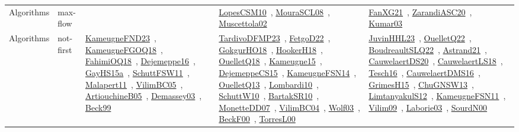 {\begin{longtable}{lp{3cm}>{\raggedright\arraybackslash}p{6cm}>{\raggedright\arraybackslash}p{6cm}>{\raggedright\arraybackslash}p{8cm}}
Algorithms & max-flow &  & \href{works/LopesCSM10.pdf}{LopesCSM10}~\cite{LopesCSM10}, \href{works/MouraSCL08.pdf}{MouraSCL08}~\cite{MouraSCL08}, \href{works/Muscettola02.pdf}{Muscettola02}~\cite{Muscettola02} & \href{works/FanXG21.pdf}{FanXG21}~\cite{FanXG21}, \href{works/ZarandiASC20.pdf}{ZarandiASC20}~\cite{ZarandiASC20}, \href{works/Kumar03.pdf}{Kumar03}~\cite{Kumar03}\\
Algorithms & not-first & \href{works/KameugneFND23.pdf}{KameugneFND23}~\cite{KameugneFND23}, \href{works/KameugneFGOQ18.pdf}{KameugneFGOQ18}~\cite{KameugneFGOQ18}, \href{works/FahimiOQ18.pdf}{FahimiOQ18}~\cite{FahimiOQ18}, \href{works/Dejemeppe16.pdf}{Dejemeppe16}~\cite{Dejemeppe16}, \href{works/GayHS15a.pdf}{GayHS15a}~\cite{GayHS15a}, \href{works/SchuttFSW11.pdf}{SchuttFSW11}~\cite{SchuttFSW11}, \href{works/Malapert11.pdf}{Malapert11}~\cite{Malapert11}, \href{works/VilimBC05.pdf}{VilimBC05}~\cite{VilimBC05}, \href{works/ArtiouchineB05.pdf}{ArtiouchineB05}~\cite{ArtiouchineB05}, \href{works/Demassey03.pdf}{Demassey03}~\cite{Demassey03}, \href{works/Beck99.pdf}{Beck99}~\cite{Beck99} & \href{works/TardivoDFMP23.pdf}{TardivoDFMP23}~\cite{TardivoDFMP23}, \href{works/FetgoD22.pdf}{FetgoD22}~\cite{FetgoD22}, \href{works/GokgurHO18.pdf}{GokgurHO18}~\cite{GokgurHO18}, \href{works/HookerH18.pdf}{HookerH18}~\cite{HookerH18}, \href{works/OuelletQ18.pdf}{OuelletQ18}~\cite{OuelletQ18}, \href{works/Kameugne15.pdf}{Kameugne15}~\cite{Kameugne15}, \href{works/DejemeppeCS15.pdf}{DejemeppeCS15}~\cite{DejemeppeCS15}, \href{works/KameugneFSN14.pdf}{KameugneFSN14}~\cite{KameugneFSN14}, \href{works/OuelletQ13.pdf}{OuelletQ13}~\cite{OuelletQ13}, \href{works/Lombardi10.pdf}{Lombardi10}~\cite{Lombardi10}, \href{works/SchuttW10.pdf}{SchuttW10}~\cite{SchuttW10}, \href{works/BartakSR10.pdf}{BartakSR10}~\cite{BartakSR10}, \href{works/MonetteDD07.pdf}{MonetteDD07}~\cite{MonetteDD07}, \href{works/VilimBC04.pdf}{VilimBC04}~\cite{VilimBC04}, \href{works/Wolf03.pdf}{Wolf03}~\cite{Wolf03}, \href{works/BeckF00.pdf}{BeckF00}~\cite{BeckF00}, \href{works/TorresL00.pdf}{TorresL00}~\cite{TorresL00} & \href{works/JuvinHHL23.pdf}{JuvinHHL23}~\cite{JuvinHHL23}, \href{works/OuelletQ22.pdf}{OuelletQ22}~\cite{OuelletQ22}, \href{works/BoudreaultSLQ22.pdf}{BoudreaultSLQ22}~\cite{BoudreaultSLQ22}, \href{works/Astrand21.pdf}{Astrand21}~\cite{Astrand21}, \href{works/CauwelaertDS20.pdf}{CauwelaertDS20}~\cite{CauwelaertDS20}, \href{works/CauwelaertLS18.pdf}{CauwelaertLS18}~\cite{CauwelaertLS18}, \href{works/Tesch16.pdf}{Tesch16}~\cite{Tesch16}, \href{works/CauwelaertDMS16.pdf}{CauwelaertDMS16}~\cite{CauwelaertDMS16}, \href{works/GrimesH15.pdf}{GrimesH15}~\cite{GrimesH15}, \href{works/ChuGNSW13.pdf}{ChuGNSW13}~\cite{ChuGNSW13}, \href{works/LimtanyakulS12.pdf}{LimtanyakulS12}~\cite{LimtanyakulS12}, \href{works/KameugneFSN11.pdf}{KameugneFSN11}~\cite{KameugneFSN11}, \href{works/Vilim09.pdf}{Vilim09}~\cite{Vilim09}, \href{works/Laborie03.pdf}{Laborie03}~\cite{Laborie03}, \href{works/SourdN00.pdf}{SourdN00}~\cite{SourdN00}\\

\end{longtable}}
